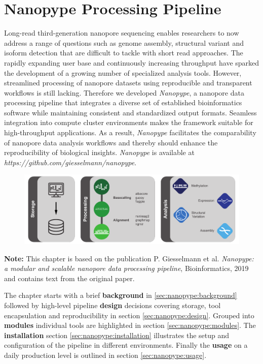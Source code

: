 \chapter{Nanopype Processing Pipeline}
\label{cha:nanopype}

Long-read third-generation nanopore sequencing enables researchers to now address a range of questions such as genome assembly, structural variant and isoform detection that are difficult to tackle with short read approaches. The rapidly expanding user base and continuously increasing throughput have sparked the development of a growing number of specialized analysis tools. However, streamlined processing of nanopore datasets using reproducible and transparent workflows is still lacking. Therefore we developed \textit{Nanopype}, a nanopore data processing pipeline that integrates a diverse set of established bioinformatics software while maintaining consistent and standardized output formats. Seamless integration into compute cluster environments makes the framework suitable for high-throughput applications. As a result, \textit{Nanopype} facilitates the comparability of nanopore data analysis workflows and thereby should enhance the reproducibility of biological insights. \textit{Nanopype} is available at \textit{https://github.com/giesselmann/nanopype}.

\begin{figure}[h]
    \centering
    \includegraphics[width=1.0\textwidth]{figures/nanopype/GA.pdf}
    \label{fig:nanopype:ga}
\end{figure}

\textbf{Note:} This chapter is based on the publication P. Giesselmann et al. \textit{Nanopype: a modular and scalable nanopore data processing pipeline}, Bioinformatics, 2019 and contains text from the original paper.

The chapter starts with a brief \textbf{background} in \ref{sec:nanopype:background} followed by high-level pipeline \textbf{design} decisions covering storage, tool encapsulation and reproducibility in section \ref{sec:nanopype:design}. Grouped into \textbf{modules} individual tools are highlighted in section \ref{sec:nanopype:modules}.
The \textbf{installation} section \ref{sec:nanopype:installation} illustrates the setup and configuration of the pipeline in different environments. 
Finally the \textbf{usage} on a daily production level is outlined in section \ref{sec:nanopype:usage}.




